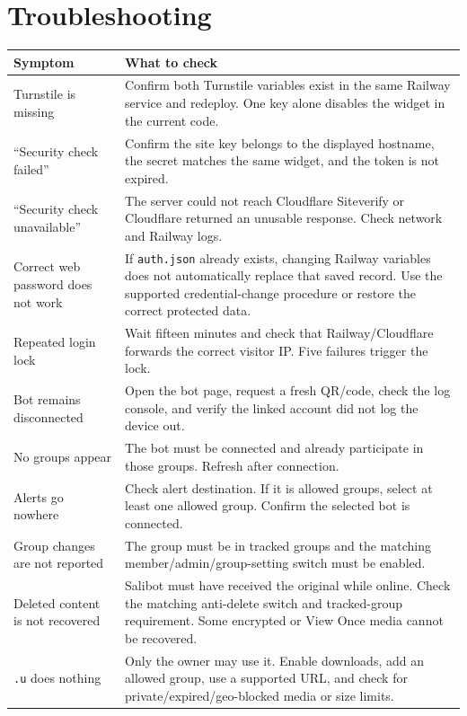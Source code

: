 \documentclass[11pt,a4paper]{article}
\begin{document}
\section{Troubleshooting}

\begin{longtable}{p{}p{}}
\toprule
\textbf{Symptom} & \textbf{What to check}\\
\midrule
\endhead
Turnstile is missing & Confirm both Turnstile variables exist in the same Railway service and redeploy. One key alone disables the widget in the current code.\\
``Security check failed'' & Confirm the site key belongs to the displayed hostname, the secret matches the same widget, and the token is not expired.\\
``Security check unavailable'' & The server could not reach Cloudflare Siteverify or Cloudflare returned an unusable response. Check network and Railway logs.\\
Correct web password does not work & If \texttt{auth.json} already exists, changing Railway variables does not automatically replace that saved record. Use the supported credential-change procedure or restore the correct protected data.\\
Repeated login lock & Wait fifteen minutes and check that Railway/Cloudflare forwards the correct visitor IP. Five failures trigger the lock.\\
Bot remains disconnected & Open the bot page, request a fresh QR/code, check the log console, and verify the linked account did not log the device out.\\
No groups appear & The bot must be connected and already participate in those groups. Refresh after connection.\\
Alerts go nowhere & Check alert destination. If it is allowed groups, select at least one allowed group. Confirm the selected bot is connected.\\
Group changes are not reported & The group must be in tracked groups and the matching member/admin/group-setting switch must be enabled.\\
Deleted content is not recovered & Salibot must have received the original while online. Check the matching anti-delete switch and tracked-group requirement. Some encrypted or View Once media cannot be recovered.\\
\texttt{.u} does nothing & Only the owner may use it. Enable downloads, add an allowed group, use a supported URL, and check for private/expired/geo-blocked media or size limits.\\

\end{longtable}
\end{document}
